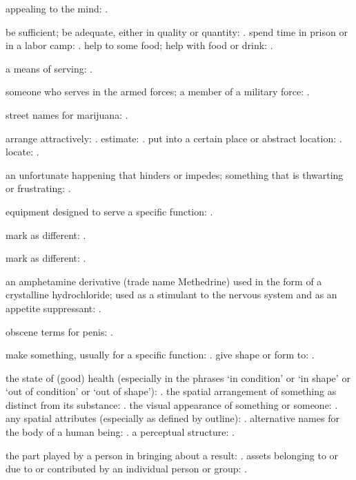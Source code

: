   appealing to the mind: .

  be sufficient; be adequate, either in quality or quantity: . spend time in prison or in a labor camp: . help to some food; help with food or drink: .

  a means of serving: .

  someone who serves in the armed forces; a member of a military force: .

  street names for marijuana: .

  arrange attractively: . estimate: . put into a certain place or abstract location: . locate: .

  an unfortunate happening that hinders or impedes; something that is thwarting or frustrating: .

  equipment designed to serve a specific function: .

  mark as different: .

  mark as different: .

  an amphetamine derivative (trade name Methedrine) used in the form of a crystalline hydrochloride; used as a stimulant to the nervous system and as an appetite suppressant: .

  obscene terms for penis: .

  make something, usually for a specific function: . give shape or form to: .

  the state of (good) health (especially in the phrases `in condition' or `in shape' or `out of condition' or `out of shape'): . the spatial arrangement of something as distinct from its substance: . the visual appearance of something or someone: . any spatial attributes (especially as defined by outline): . alternative names for the body of a human being: . a perceptual structure: .

  the part played by a person in bringing about a result: . assets belonging to or due to or contributed by an individual person or group: .


